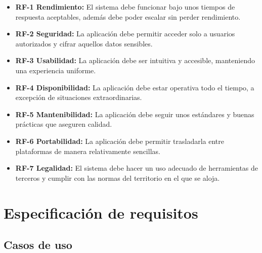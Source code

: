 \begin{itemize}
	\tightlist
	\item \textbf{RF-1 Rendimiento:} El sistema debe funcionar bajo unos tiempos de respuesta aceptables, además debe poder escalar sin perder rendimiento.
	\item \textbf{RF-2 Seguridad:} La aplicación debe permitir acceder solo a usuarios autorizados y cifrar aquellos datos sensibles.
	\item \textbf{RF-3 Usabilidad:} La aplicación debe ser intuitiva y accesible, manteniendo una experiencia uniforme.
	\item \textbf{RF-4 Disponibilidad:} La aplicación debe estar operativa todo el tiempo, a excepción de situaciones extraordinarias.
	\item \textbf{RF-5 Mantenibilidad:} La aplicación debe seguir unos estándares y buenas prácticas que aseguren calidad.
	\item \textbf{RF-6 Portabilidad:} La aplicación debe permitir trasladarla entre plataformas de manera relativamente sencillas.
	\item \textbf{RF-7 Legalidad:} El sistema debe hacer un uso adecuado de herramientas de terceros y cumplir con las normas del territorio en el que se aloja.
\end{itemize}

\section{Especificación de requisitos}\label{sec:especificacion-de-requisitos}

\subsection{Casos de uso}\label{subsec:casos-de-uso}

